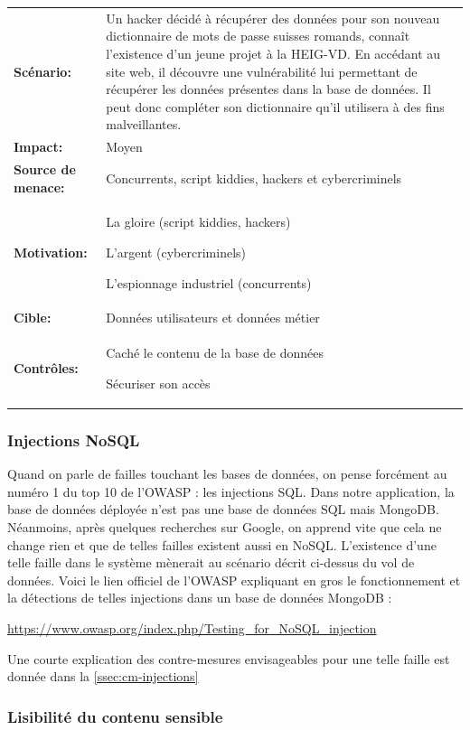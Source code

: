 \documentclass[12pt]{article}
\begin{document}
\renewcommand{\arraystretch}{1.6}
\begin{tabular}{@{}p{4cm}p{12cm}}
\textbf{Scénario:} &  Un hacker décidé à récupérer des données pour son nouveau dictionnaire de mots de passe suisses romands, connaît l'existence d'un jeune projet à la HEIG-VD. En accédant au site web, il découvre une vulnérabilité lui permettant de récupérer les données présentes dans la base de données. Il peut donc compléter son dictionnaire qu'il utilisera à des fins malveillantes. \\
\textbf{Impact:} & Moyen \\
\textbf{Source de menace: } & Concurrents, script kiddies, hackers et cybercriminels \\
\textbf{Motivation:} & La gloire (script kiddies, hackers)

L'argent (cybercriminels)

L'espionnage industriel (concurrents) \\
\textbf{Cible:} & Données utilisateurs et données métier \\
\textbf{Contrôles:} & Caché le contenu de la base de données

Sécuriser son accès
\end{tabular}
\renewcommand{\arraystretch}{1}

\subsubsection{Injections NoSQL}

Quand on parle de failles touchant les bases de données, on pense forcément au numéro 1 du top 10 de l'OWASP : les injections SQL. Dans notre application, la base de données déployée n'est pas une base de données SQL mais MongoDB. Néanmoins, après quelques recherches sur Google, on apprend vite que cela ne change rien et que de telles failles existent aussi en NoSQL. L'existence d'une telle faille dans le système mènerait au scénario décrit ci-dessus du vol de données. Voici le lien officiel de l'OWASP expliquant en gros le fonctionnement et la détections de telles injections dans un base de données MongoDB :

\url{https://www.owasp.org/index.php/Testing_for_NoSQL_injection}

Une courte explication des contre-mesures envisageables pour une telle faille est donnée dans la \autoref{ssec:cm-injections}

\subsubsection{Lisibilité du contenu sensible}
\end{document}
